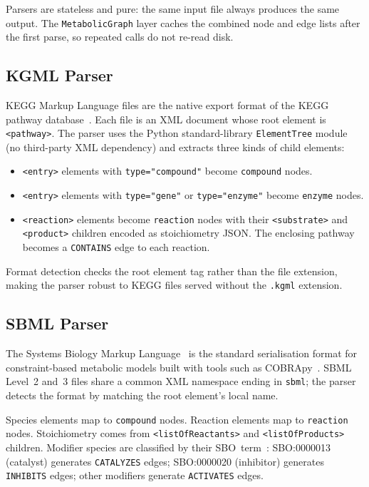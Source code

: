 \documentclass[10pt]{article}
\begin{document}
Parsers are stateless and pure: the same input file always produces the same
output. The \texttt{MetabolicGraph} layer caches the combined node and edge
lists after the first parse, so repeated calls do not re-read disk.

\subsection{KGML Parser}

KEGG Markup Language files are the native export format of the KEGG pathway
database~\citep{kanehisa2021kegg}. Each file is an XML document whose root
element is \texttt{<pathway>}. The parser uses the Python standard-library
\texttt{ElementTree} module (no third-party XML dependency) and extracts three
kinds of child elements:

\begin{itemize}[leftmargin=*,itemsep=2pt]
  \item \texttt{<entry>} elements with \texttt{type="compound"} become
    \texttt{compound} nodes.
  \item \texttt{<entry>} elements with \texttt{type="gene"} or
    \texttt{type="enzyme"} become \texttt{enzyme} nodes.
  \item \texttt{<reaction>} elements become \texttt{reaction} nodes with
    their \texttt{<substrate>} and \texttt{<product>} children encoded as
    stoichiometry JSON. The enclosing pathway becomes a \texttt{CONTAINS}
    edge to each reaction.
\end{itemize}

Format detection checks the root element tag rather than the file extension,
making the parser robust to KEGG files served without the \texttt{.kgml}
extension.

\subsection{SBML Parser}

The Systems Biology Markup Language~\citep{keating2020sbml} is the standard
serialisation format for constraint-based metabolic models built with tools
such as COBRApy~\citep{ebrahim2013cobrapy}. SBML Level~2 and~3 files share a
common XML namespace ending in \texttt{sbml}; the parser detects the format by
matching the root element's local name.

Species elements map to \texttt{compound} nodes. Reaction elements map to
\texttt{reaction} nodes. Stoichiometry comes from
\texttt{<listOfReactants>} and \texttt{<listOfProducts>} children. Modifier
species are classified by their SBO~term~\citep{courtot2011sbo}: SBO:0000013
(catalyst) generates \texttt{CATALYZES} edges; SBO:0000020 (inhibitor)
generates \texttt{INHIBITS} edges; other modifiers generate
\texttt{ACTIVATES} edges.
\end{document}
